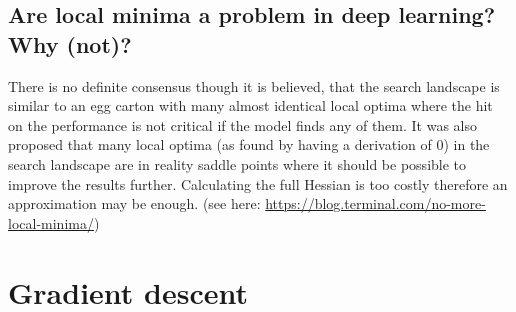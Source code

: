 \subsection{Are local minima a problem in deep learning?  Why (not)?}
There is no definite consensus though it is believed, that the search landscape is similar to an egg carton with many almost identical local optima where the hit on the performance is not critical if the model finds any of them. It was also proposed that many local optima (as found by having a derivation of 0) in the search landscape are in reality saddle points where it should be possible to improve the results further. Calculating the full Hessian is too costly therefore an approximation may be enough. (see here: \url{https://blog.terminal.com/no-more-local-minima/})
%
\section{Gradient descent}
